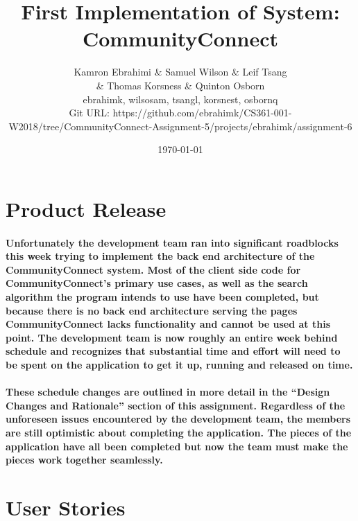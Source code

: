 \documentclass[12pt]{article}
\title{First Implementation of System: CommunityConnect}
\author{Kamron Ebrahimi \& Samuel Wilson \& Leif Tsang \\ \& Thomas Korsness  \& Quinton Osborn \\ ebrahimk, wilsosam, tsangl, korsnest, osbornq \\ \scriptsize{Git URL: https://github.com/ebrahimk/CS361-001-W2018/tree/CommunityConnect-Assignment-5/projects/ebrahimk/assignment-6}}
\date{\today}
\begin{document}
\maketitle

\tableofcontents

\newpage
\section{\bf  Product Release}
  \paragraph{\normalfont \indent  Unfortunately the development team ran into significant roadblocks this week trying to implement the back end architecture of the CommunityConnect system. Most of the client side code for CommunityConnect’s primary use cases,  as well as the search algorithm the program intends to use have been completed, but because there is no back end architecture serving the pages CommunityConnect lacks functionality and cannot be used at this point. The development team is now roughly an entire week behind schedule and recognizes that substantial time and effort will need to be spent on the application to get it up, running and released on time.
  }
  \paragraph{\normalfont \indent These schedule changes are outlined in more detail in the “Design Changes and Rationale” section of this assignment. Regardless of the unforeseen issues encountered by the development team, the members are still optimistic about completing the application. The pieces of the application have all been completed but now the team must make the pieces work together seamlessly.
  }


\section{\bf  User Stories }
\end{document}

